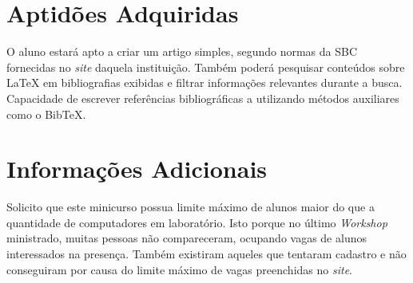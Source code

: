 \documentclass{article}
\begin{document}
\section{Aptidões Adquiridas}
\label{sec:aptidoes-adquiridas}

O aluno estará apto a criar um artigo simples, segundo normas da SBC fornecidas
no \emph{site} daquela instituição. Também poderá pesquisar conteúdos sobre
\LaTeX{} em bibliografias exibidas e filtrar informações relevantes durante a
busca. Capacidade de escrever referências bibliográficas a utilizando métodos
auxiliares como o Bib\TeX{}.

\section{Informações Adicionais}
\label{sec:informacoes-adicionais}

Solicito que este minicurso possua limite máximo de alunos maior do que a
quantidade de computadores em laboratório. Isto porque no último \emph{Workshop}
ministrado, muitas pessoas não compareceram, ocupando vagas de alunos
interessados na presença. Também existiram aqueles que tentaram cadastro e não
conseguiram por causa do limite máximo de vagas preenchidas no \emph{site}.



\end{document}
